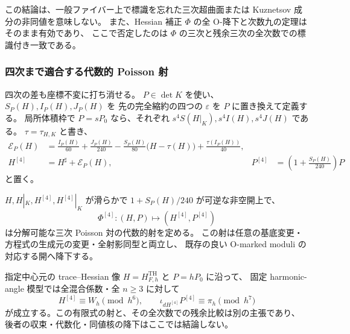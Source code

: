 この結論は、一般ファイバー上で標識を忘れた三次超曲面または
Kuznetsov 成分の非同値を意味しない。
また、Hessian 補正 $\Phi$ の全 O-降下と次数九の定理はそのまま有効であり、
ここで否定したのは $\Phi$ の三次と残余三次の全次数での標識付き一致である。

\subsubsection{四次まで適合する代数的 Poisson 射}

四次の差も座標不変に打ち消せる。
$P\in\det K$ を使い、$S_P(H),I_P(H),J_P(H)$ を
先の完全縮約の四つの $\varepsilon$ を $P$ に置き換えて定義する。
局所体積枠で $P=sP_0$ なら、それぞれ
$s^4S(H|_K),s^4I(H),s^4J(H)$ である。
$\tau=\tau_{H,K}$ と書き、
\begin{align}
 \mathcal E_P(H)
  &=\frac{I_P(H)}{60}+\frac{J_P(H)}{240}
     -\frac{S_P(H)}{80}\bigl(H-\tau(H)\bigr)
     +\frac{\tau(I_P(H))}{40},\label{eq:nfm-fourth-invariant-correction}\\
 H^{[4]}&=H^\sharp+\mathcal E_P(H),&
 P^{[4]}&=\left(1+\frac{S_P(H)}{240}\right)P
 \label{eq:nfm-fourth-corrected-pair}
\end{align}
と置く。

\begin{theorem}[全 O-同値へ降下する四次補正]
\label{thm:nfm-fourth-algebraic-correction}
$H,H|_K,H^{[4]},H^{[4]}|_K$ が滑らかで
$1+S_P(H)/240$ が可逆な非空開上で、
\[
 \Phi^{[4]}:(H,P)\longmapsto(H^{[4]},P^{[4]})
\]
は分解可能な三次 Poisson 対の代数的射を定める。
この射は任意の基底変更・方程式の生成元の変更・全射影同型と両立し、
既存の良い O-marked moduli の対応する開へ降下する。

指定中心元の trace--Hessian 像
$H=H^{\mathrm{TH}}_{F,h}$ と $P=hP_0$ に沿って、
固定 harmonic-angle 模型では全混合係数・全 $n\ge3$ に対して
\[
 H^{[4]}\equiv W_h\pmod{h^6},\qquad
 \iota_{dH^{[4]}}P^{[4]}\equiv\pi_h\pmod{h^7}
\]
が成立する。この有限式の射と、その全次数での残余比較は別の主張であり、
後者の収束・代数化・同値核の降下はここでは結論しない。
\end{theorem}

